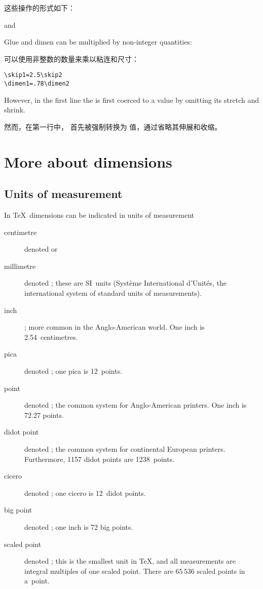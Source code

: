 \documentclass[twoside,letterpaper]{rapport3}
\begin{document}
这些操作的形式如下：
\begin{Disp}%
\end{Disp} 
and
\begin{Disp}%
\end{Disp}

Glue and dimen can be multiplied by 
non-integer quantities:

可以使用非整数的数量来乘以粘连和尺寸：
\begin{verbatim}
\skip1=2.5\skip2
\dimen1=.78\dimen2
\end{verbatim}
However, in the first line the  is first coerced
to a  value by omitting its stretch and shrink.

然而，在第一行中， 首先被强制转换为  值，通过省略其伸展和收缩。
\section{More about dimensions}

\subsection{Units of measurement}

In \TeX\ dimensions can be indicated in
\term units of measurement\par
\begin{description} \item [centimetre]
    denoted  or 
\item [millimetre]
	denoted ; these are SI~units ({\italic Syst\`eme International
	d'Unit\'es}, the
	international system of standard units of measurements).
\item [inch]
; more common in the Anglo-American world.
One inch is 2.54~centimetres.
\item [pica]
    denoted ; one pica is 12~points.
\item [point]
    denoted ; the common system
for Anglo-American printers. One inch is 72.27 points.
\item [didot point]
    denoted ; the common system for continental European printers.
    Furthermore, 1157 didot points are 1238~points.
\item [cicero]
    denoted ; one cicero is 12~didot points.
\item [big point]
    denoted ; one inch is 72 big points.
\item [scaled point]
    denoted ; this is the smallest unit in \TeX, and all measurements
    are integral multiples of one scaled point.
    There are $65\,536$ scaled points in a~point.
\end{description}
\end{document}
